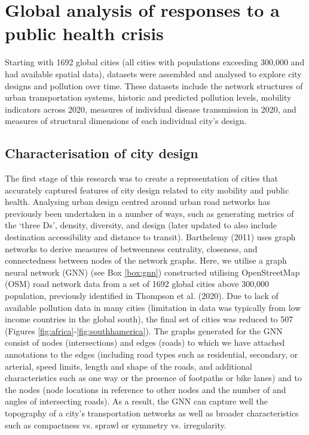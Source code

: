 \documentclass[preprint,10pt]{elsarticle} %
\begin{document}
\section*{\textcolor{OliveGreen}{Global analysis of responses to a public health crisis}}

Starting with 1692 global cities (all cities with populations exceeding 300,000 and had available spatial data\cite{UNDESA2019}), datasets were assembled and analysed to explore city designs and pollution over time. These datasets include the network structures of urban transportation systems, historic and predicted pollution levels, mobility indicators across 2020, measures of individual disease transmission in 2020, and measures of structural dimensions of each individual city's design.

\subsection*{Characterisation of city design}
The first stage of this research was to create a representation of cities that accurately captured features of city design related to city mobility and public health. Analysing urban design centred around urban road networks has previously been undertaken in a number of ways, such as generating metrics of the `three Ds'\cite{Ewing2010}, density, diversity, and design (later updated to also include destination accessibility and distance to transit). Barthelemy (2011)\cite{Barthelemy2011} uses graph networks to derive measures of betweenness centrality, closeness, and connectedness between nodes of the network graphs. Here, we utilise a graph neural network (GNN) (see Box \ref{box:gnn}) constructed utilising OpenStreetMap (OSM) road network data\cite{Boeing2017a} from a set of 1692 global cities above 300,000 population, previously identified in Thompson et al. (2020)\cite{Thompson2020}. Due to lack of available pollution data in many cities (limitation in data was typically from low income countries in the global south), the final set of cities was reduced to 507 (Figures \ref{fig:africa}-\ref{fig:southhamerica}). The graphs generated for the GNN consist of nodes (intersections) and edges (roads) to which we have attached annotations to the edges (including road types such as residential, secondary, or arterial, speed limits, length and shape of the roads, and additional characteristics such as one way or the presence of footpaths or bike lanes) and to the nodes (node locations in reference to other nodes and the number of and angles of intersecting roads). As a result, the GNN can capture well the topography of a city's transportation networks as well as broader characteristics such as compactness vs. sprawl or symmetry vs. irregularity.  
\end{document}
